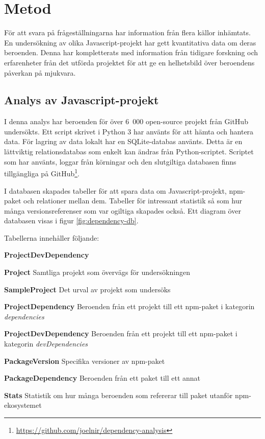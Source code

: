 \section{Metod}
\label{sec:joel_o-method}
För att svara på frågeställningarna har information från flera källor inhämtats. En undersökning av olika Javascript-projekt har gett kvantitativa data om deras beroenden. Denna har kompletterats med information från tidigare forskning och erfarenheter från det utförda projektet för att ge en helhetsbild över beroendens påverkan på mjukvara.

\subsection{Analys av Javascript-projekt}
\label{subsec:joel_o-method-analys}
I denna analys har beroenden för över 6~000 open-source projekt från GitHub undersökts. Ett script skrivet i Python 3 har använts för att hämta och hantera data. För lagring av data lokalt har en SQLite-databas använts. Detta är en lättviktig relationsdatabas som enkelt kan ändras från Python-scriptet. Scriptet som har använts, loggar från körningar och den slutgiltiga databasen finns tillgängliga på GitHub\footnote{\url{https://github.com/joelnir/dependency-analysis}}.

I databasen skapades tabeller för att spara data om Javascript-projekt, npm-paket och relationer mellan dem. Tabeller för intressant statistik så som hur många versionsreferenser som var ogiltiga skapades också. Ett diagram över databasen visas i figur \ref{fig:dependency-db}.

Tabellerna innehåller följande:

\begin{labeling}{\textbf{ProjectDevDependency}}
  \item [\textbf{Project}] Samtliga projekt som övervägs för undersökningen
  \item [\textbf{SampleProject}] Det urval av projekt som undersöks
  \item [\textbf{ProjectDependency}] Beroenden från ett projekt till ett npm-paket i kategorin \textit{dependencies}
  \item [\textbf{ProjectDevDependency}] Beroenden från ett projekt till ett npm-paket i kategorin \textit{devDependencies}
  \item [\textbf{PackageVersion}] Specifika versioner av npm-paket
  \item [\textbf{PackageDependency}] Beroenden från ett paket till ett annat
  \item [\textbf{Stats}] Statistik om hur många beroenden som refererar till paket utanför npm-ekosystemet
\end{labeling}

